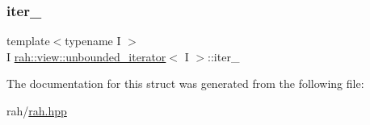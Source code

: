\mbox{\label{structrah_1_1view_1_1unbounded__iterator_a50affaae71d4122b92014b11763f6672}} 
\subsubsection{\texorpdfstring{iter\_}{iter\_}}
{\footnotesize\ttfamily template$<$typename I $>$ \\
I \mbox{\hyperlink{structrah_1_1view_1_1unbounded__iterator}{rah\+::view\+::unbounded\+\_\+iterator}}$<$ I $>$\+::iter\+\_\+}



The documentation for this struct was generated from the following file\+:\begin{DoxyCompactItemize}
\item 
rah/\mbox{\hyperlink{rah_8hpp}{rah.\+hpp}}\end{DoxyCompactItemize}
